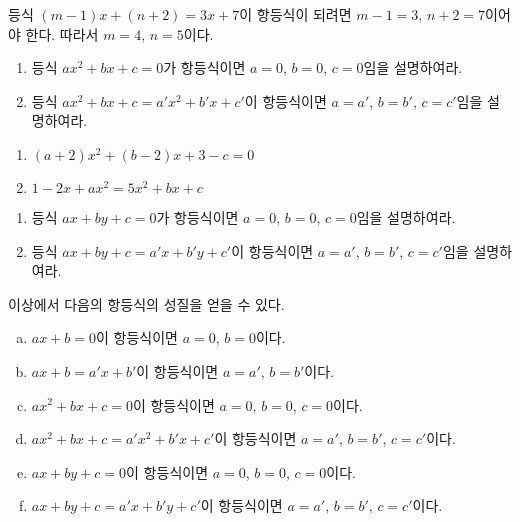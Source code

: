 \documentclass{oblivoir}
\begin{document}
%
\exam{}
등식 \((m-1)x+(n+2)=3x+7\)이 항등식이 되려면 \(m-1=3\), \(n+2=7\)이어야 한다.
따라서 \(m=4\), \(n=5\)이다.

\clearpage
%
\prob{}
\begin{enumerate}[(1)]
\item
등식 \(ax^2+bx+c=0\)가 항등식이면 \(a=0\), \(b=0\), \(c=0\)임을 설명하여라.
\item
등식 \(ax^2+bx+c=a'x^2+b'x+c'\)이 항등식이면 \(a=a'\), \(b=b'\), \(c=c'\)임을 설명하여라.
\end{enumerate}


%
\begin{enumerate}[(1)]
\item
\((a+2)x^2+(b-2)x+3-c=0\)
\item
\(1-2x+ax^2=5x^2+bx+c\)
\end{enumerate}

\clearpage
%
\prob{}
\begin{enumerate}[(1)]
\item
등식 \(ax+by+c=0\)가 항등식이면 \(a=0\), \(b=0\), \(c=0\)임을 설명하여라.
\item
등식 \(ax+by+c=a'x+b'y+c'\)이 항등식이면 \(a=a'\), \(b=b'\), \(c=c'\)임을 설명하여라.
\end{enumerate}


\bigskip\bigskip
이상에서 다음의 항등식의 성질을 얻을 수 있다.
\begin{mdframed}
%
\begin{enumerate}[(a)]
\item
\(ax+b=0\)이 항등식이면 \(a=0\), \(b=0\)이다.
\item
\(ax+b=a'x+b'\)이 항등식이면 \(a=a'\), \(b=b'\)이다.
\item
\(ax^2+bx+c=0\)이 항등식이면 \(a=0\), \(b=0\), \(c=0\)이다.
\item
\(ax^2+bx+c=a'x^2+b'x+c'\)이 항등식이면 \(a=a'\), \(b=b'\), \(c=c'\)이다.
\item
\(ax+by+c=0\)이 항등식이면 \(a=0\), \(b=0\), \(c=0\)이다.
\item
\(ax+by+c=a'x+b'y+c'\)이 항등식이면 \(a=a'\), \(b=b'\), \(c=c'\)이다.
\end{enumerate}
\end{mdframed}
\end{document}
